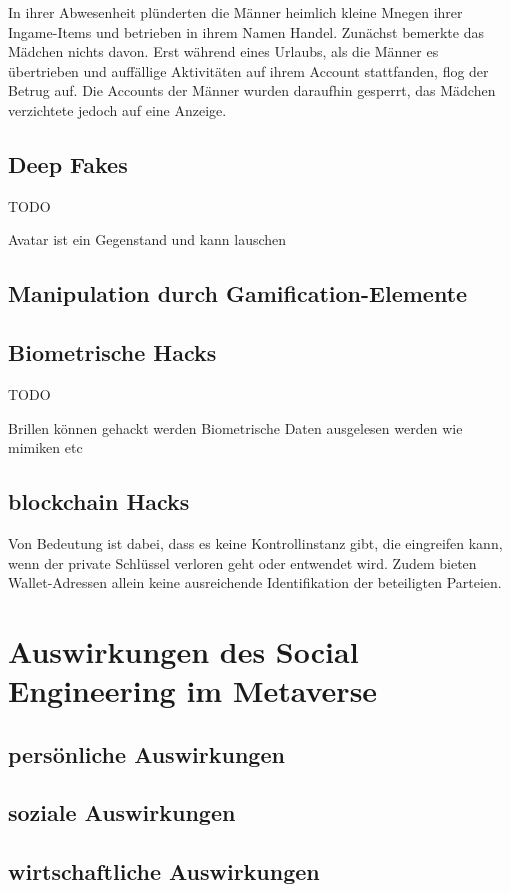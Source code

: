 In ihrer Abwesenheit plünderten die Männer heimlich kleine Mnegen ihrer Ingame-Items und betrieben in ihrem Namen Handel. Zunächst bemerkte das Mädchen nichts davon. Erst während eines Urlaubs, als die Männer es übertrieben und auffällige Aktivitäten auf ihrem Account stattfanden, flog der Betrug auf. Die Accounts der Männer wurden daraufhin gesperrt, das Mädchen verzichtete jedoch auf eine Anzeige.


\subsection{Deep Fakes}
TODO

Avatar ist ein Gegenstand und kann lauschen
\subsection{Manipulation durch Gamification-Elemente}
\subsection{Biometrische Hacks}
TODO

Brillen können gehackt werden Biometrische Daten ausgelesen werden wie mimiken etc 

\subsection{blockchain Hacks}

Von Bedeutung ist dabei, dass es keine Kontrollinstanz gibt, die eingreifen kann, wenn der private Schlüssel verloren geht oder entwendet wird. Zudem bieten Wallet-Adressen allein keine ausreichende Identifikation der beteiligten Parteien.

\section{Auswirkungen des Social Engineering im Metaverse}

\subsection{persönliche Auswirkungen}
\subsection{soziale Auswirkungen}
\subsection{wirtschaftliche Auswirkungen}

